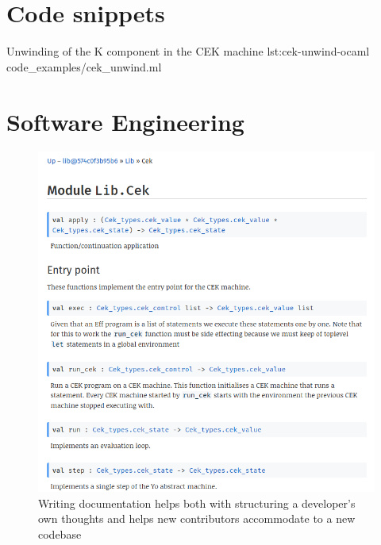 \documentclass[%
    12pt,
    bibliography=toc,
    listof=leveldown,%
    oneside
]{book}
\begin{document}
\begin{appendices}
\chapter{Code snippets}
\label{sec:code-snippets}
\setcounter{page}{1}

{Unwinding of the K component in the CEK machine}
{lst:cek-unwind-ocaml}
{code_examples/cek_unwind.ml}

\chapter{Software Engineering}

\begin{figure}
    \centering
    \includegraphics[width=35em]{screenshots/documentation.png}

    \caption{Writing documentation helps both with structuring a developer's own
    thoughts and helps new contributors accommodate to a new codebase}
    \label{fig:app-screenshot-documentation}
\end{figure}


\end{appendices}
\end{document}
